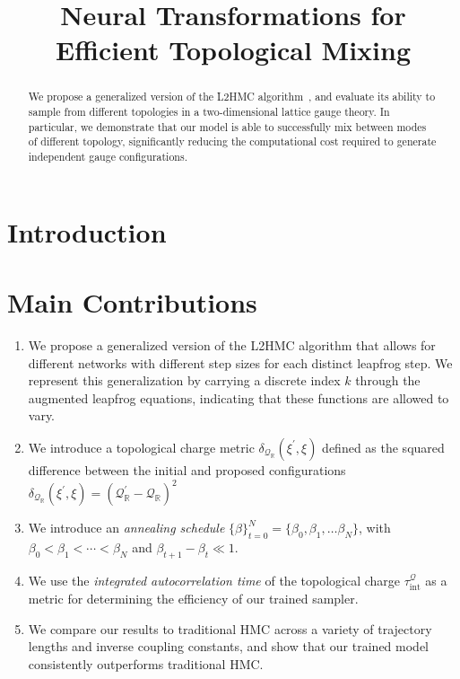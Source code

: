 \documentclass{article} %
\title{Neural Transformations for \\Efficient Topological Mixing}%
\author{Sam Foreman, Xiao-Yong Jin\& James Osborn\thanks{\hyperref{%
      https://github.com/saforem2/l2hmc-qcd
   }{https://github.com/saforem2/l2hmc-qcd} \\
   Leadership Computing Facility\\
   Argonne National Laboratory\\
   Lemont, IL 60439
   \texttt{\{foremans,xjin,\}@anl.gov},%
   \texttt{\{osborn\}@alcf.anl.gov}\\
}}
\begin{document}
\maketitle

\begin{abstract}
   We propose a generalized version of the L2HMC algorithm~\citep{levy2017}, and evaluate its ability to sample from
   different topologies in a two-dimensional lattice gauge theory.
   In particular, we demonstrate that our model is able to successfully mix between modes of different topology,
   significantly reducing the computational cost required to generate independent gauge configurations.
\end{abstract}

\section{\label{sec:introduction}Introduction}
\color{red}{TODO:\@ Complete introduction}\color{black}
%
\section{\label{sec:main_contributions}Main Contributions}
\begin{enumerate}
   \item We propose a generalized version of the L2HMC algorithm that allows for different networks with different step
      sizes for each distinct leapfrog step. We represent this generalization by carrying a discrete index \(k\) through
      the augmented leapfrog equations, indicating that these functions are allowed to vary.
   \item We introduce a topological charge metric \(\delta_{\mathcal{Q}_{\mathbb{R}}}(\xi^{\prime}, \xi)\) defined as
      the squared difference between the initial and proposed configurations
      \(\delta_{\mathcal{Q}_{\mathbb{R}}}(\xi^{\prime}, \xi) = {\left(\mathcal{Q}_{\mathbb{R}}^{\prime} -
      \mathcal{Q}_{\mathbb{R}}\right)}^{2}\)
   \item We introduce an \emph{annealing schedule} \({\{\beta\}}_{t=0}^{N} = \{\beta_{0}, \beta_{1},
      \ldots \beta_{N}\}\), with \(\beta_{0} < \beta_{1} < \cdots < \beta_{N}\) and \(\beta_{t+1} - \beta_{t} \ll
         1\).
   \item We use the \emph{integrated autocorrelation time} of the topological charge
      \(\tau_{\mathrm{int}}^{\mathcal{Q}}\) as a metric for determining the efficiency of our trained sampler.
   \item We compare our results to traditional HMC across a variety of trajectory lengths and inverse coupling
      constants, and show that our trained model consistently outperforms traditional HMC.\@
\end{enumerate}
%
\end{document}
